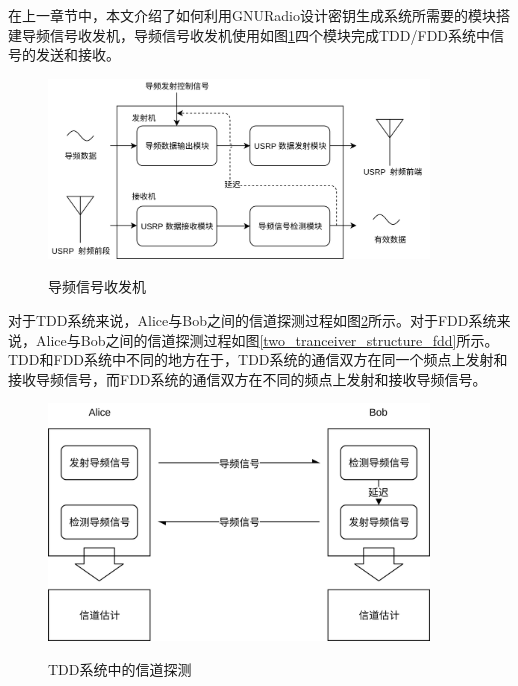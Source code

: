 \documentclass[master]{seuthesis} %
\begin{document}
\begin{Main}
在上一章节中，本文介绍了如何利用GNURadio设计密钥生成系统所需要的模块搭建导频信号收发机，导频信号收发机使用如图\ref{tranceiver_structure}四个模块完成TDD/FDD系统中信号的发送和接收。

\begin{figure}
    \centering
    \includegraphics[width=0.9\textwidth]{images/tranceiver_structure}
    \caption{导频信号收发机}{} 
    \label{tranceiver_structure}
\end{figure}

对于TDD系统来说，Alice与Bob之间的信道探测过程如图\ref{two_tranceiver_structure}所示。对于FDD系统来说，Alice与Bob之间的信道探测过程如图\ref{two_tranceiver_structure_fdd}所示。TDD和FDD系统中不同的地方在于，TDD系统的通信双方在同一个频点上发射和接收导频信号，而FDD系统的通信双方在不同的频点上发射和接收导频信号。


\begin{figure}
    \centering
    \includegraphics[width=0.9\textwidth]{images/two_tranceiver_structure}
    \caption{TDD系统中的信道探测}{} 
    \label{two_tranceiver_structure}
\end{figure}


\end{Main}
\end{document}

